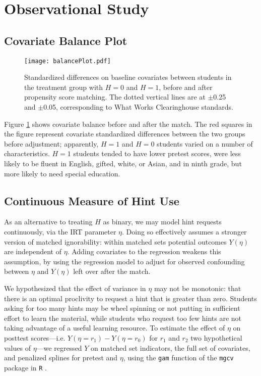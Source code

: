 \section{Observational Study}
\subsection{Covariate Balance Plot}
\begin{figure}
\centering
\texttt{[image: balancePlot.pdf]}
\caption{Standardized differences on baseline covariates between
  students in the treatment group with $H=0$ and $H=1$, before and
  after propensity score matching. The dotted vertical lines are at
  $\pm$0.25 and $\pm$0.05, corresponding to What Works Clearinghouse
  standards.}
\label{fig:balance}
\end{figure}

Figure \ref{fig:balance} shows covariate balance before and after the
match.
The red squares in the figure represent covariate standardized differences
between the two groups before adjustment; apparently, $H=1$ and $H=0$
students varied on a number of characteristics.
$H=1$ students tended to have lower pretest scores, were less likely
to be fluent in English, gifted, white, or Asian, and in ninth grade,
but more likely to need special education.

\subsection{Continuous Measure of Hint Use}

As an alternative to treating $H$ as binary, we may model hint requests continuously, via
the IRT parameter $\eta$.
Doing so effectively assumes a stronger version of matched
ignorability: within matched sets potential outcomes $Y(\eta)$ are
independent of $\eta$.
Adding covariates to the regression weakens this assumption, by using
the regression model to adjust for observed confounding between $\eta$
and $Y(\eta)$ left over after the match.

We hypothesized that the effect of variance in $\eta$ may not be
monotonic: that there is an optimal proclivity to request a hint that
is greater than zero.
Students asking for too many  hints may be wheel spinning
\citep[c.f.][]{wheelSpinning} or not putting in sufficient effort to
learn the material, while students who request too few hints are not
taking advantage of a useful learning resource.
To estimate the effect of $\eta$ on posttest
scores---i.e. $Y(\eta=r_1)-Y(\eta=r_0)$ for $r_1$ and $r_2$ two
hypothetical values of $\eta$---we regressed $Y$ on matched set
indicators, the full set of covariates, and penalized splines for
pretest and $\eta$, using the \texttt{gam} function of the
\texttt{mgcv} package in \texttt{R} \citep{mgcv}.

